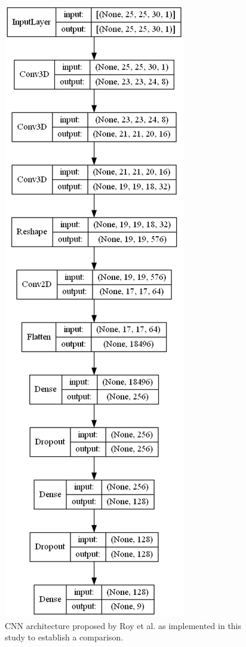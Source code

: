 \begin{figure}[bp]
    \centering
    \includegraphics[width=\linewidth]{figs/vineyard_classification/networks/hybrid_sn_25x24_8.png}
	\caption{CNN architecture proposed by Roy et al. \cite{roy_hybridsn_2020} as implemented in this study to establish a comparison. }
	\label{fig:hybridsn_cnn}
\end{figure}